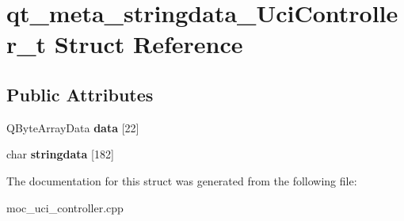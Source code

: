 \hypertarget{structqt__meta__stringdata__UciController__t}{\section{qt\-\_\-meta\-\_\-stringdata\-\_\-\-Uci\-Controller\-\_\-t Struct Reference}
\label{structqt__meta__stringdata__UciController__t}
}
\subsection*{Public Attributes}
\begin{DoxyCompactItemize}
\item 
\hypertarget{structqt__meta__stringdata__UciController__t_a329a0728dc85bdcf2a30492ceb804050}{Q\-Byte\-Array\-Data {\bfseries data} \mbox{[}22\mbox{]}}\label{structqt__meta__stringdata__UciController__t_a329a0728dc85bdcf2a30492ceb804050}

\item 
\hypertarget{structqt__meta__stringdata__UciController__t_add6213c7b647f605bc52f413a14c0ee9}{char {\bfseries stringdata} \mbox{[}182\mbox{]}}\label{structqt__meta__stringdata__UciController__t_add6213c7b647f605bc52f413a14c0ee9}

\end{DoxyCompactItemize}


The documentation for this struct was generated from the following file\-:\begin{DoxyCompactItemize}
\item 
moc\-\_\-uci\-\_\-controller.\-cpp\end{DoxyCompactItemize}
